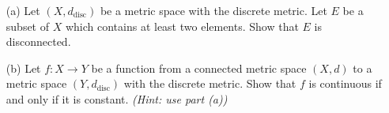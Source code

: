 \begin{problem}[15pts]
      \begin{enumerate}
  \item[(a)] Let $(X,d_{\mathrm{disc}})$ be a metric space with the discrete metric.  
Let $E$ be a subset of $X$ which contains at least two elements.  
Show that $E$ is disconnected.

\medskip
\item[(b)] 
Let $f : X \to Y$ be a function from a connected metric space $(X,d)$ to a metric space $(Y,d_{\mathrm{disc}})$ with the discrete metric.  
Show that $f$ is continuous if and only if it is constant.  
\emph{(Hint: use part (a))}
 
  \end{enumerate}
\end{problem}

